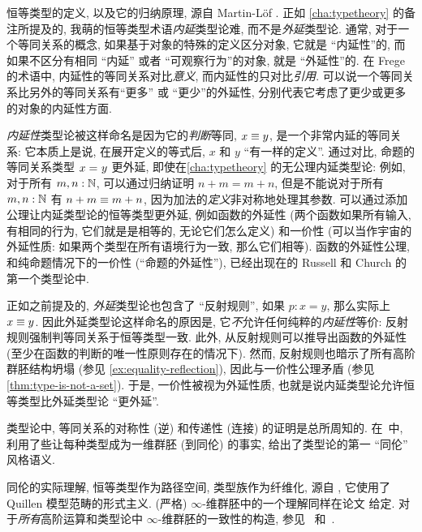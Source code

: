 \sectionNotes

恒等类型的定义, 以及它的归纳原理, 源自 Martin-L\"of \cite{Martin-Lof-1972}.
%
%
%
%
%
正如 \cref{cha:typetheory} 的备注所提及的, 我萌的恒等类型术语\emph{内延}类型论难, 而不是\emph{外延}类型论.
通常, 对于一个等同关系的概念, 如果基于对象的特殊的定义区分对象, 它就是 ``内延性''的, 而如果不区分有相同 ``内延'' 或者 ``可观察行为''的对象, 就是 ``外延性''的.
在 Frege 的术语中, 内延性的等同关系对比\emph{意义}, 而内延性的只对比\emph{引用}.
可以说一个等同关系比另外的等同关系有``更多'' 或 ``更少''的外延性, 分别代表它考虑了更少或更多的对象的内延性方面.

\emph{内延性}类型论被这样命名是因为它的\emph{判断}等同, $x\equiv y$, 是一个非常内延的等同关系: 它本质上是说, 在展开定义的等式后, $x$ 和 $y$ ``有一样的定义''.
通过对比, 命题的等同关系类型 $x =_{} y$ 更外延, 即使在\cref{cha:typetheory} 的无公理内延类型论: 例如, 对于所有 $m,n:\mathbb{N}$, 可以通过归纳证明 $n+m=m+n$, 但是不能说对于所有 $m,n:\mathbb{N}$ 有 $n+m\equiv m+n$, 因为加法的\emph{定义}非对称地处理其参数.
可以通过添加公理让内延类型论的恒等类型更外延, 例如函数的外延性 (两个函数如果所有输入, 有相同的行为, 它们就是是相等的, 无论它们怎么定义) 和一价性 (可以当作宇宙的外延性质: 如果两个类型在所有语境行为一致, 那么它们相等).
函数的外延性公理, 和纯命题情况下的一价性 (``命题的外延性''), 已经出现在的 Russell 和 Church 的第一个类型论中.

正如之前提及的, \emph{外延}类型论也包含了 ``反射规则'', 如果 $p:x=y$, 那么实际上 $x\equiv y$.
因此外延类型论这样命名的原因是, 它\emph{不}允许任何纯粹的\emph{内延性}等价: 反射规则强制判等同关系于恒等类型一致.
此外, 从反射规则可以推导出函数的外延性 (至少在函数的判断的唯一性原则存在的情况下).
然而, 反射规则也暗示了所有高阶群胚结构坍塌 (参见 \cref{ex:equality-reflection}), 因此与一价性公理矛盾 (参见 \cref{thm:type-is-not-a-set}).
于是, 一价性被视为外延性质, 也就是说内延类型论允许恒等类型比外延类型论 ``更外延''.

类型论中, 等同关系的对称性 (逆) 和传递性 (连接) 的证明是总所周知的.
在~\cite{hs:gpd-typethy}中, 利用了些让每种类型成为一维群胚 (到同伦) 的事实, 给出了类型论的第一 ``同伦'' 风格语义.

同伦的实际理解, 恒等类型作为路径空间, 类型族作为纤维化, 源自 \cite{AW}, 它使用了 Quillen 模型范畴的形式主义.
(严格) $\infty$-维群胚中的一个理解同样在论文 \cite{mw:thesis} 给定.
对于\emph{所有}高阶运算和类型论中 $\infty$-维群胚的一致性的构造, 参见~\cite{pll:wkom-type} 和~\cite{bg:type-wkom}.

